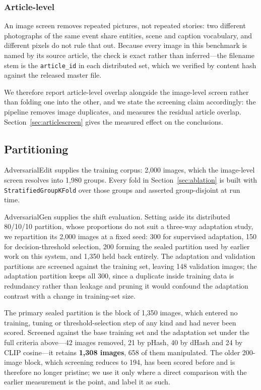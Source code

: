 \documentclass[journal]{IEEEtran}
\begin{document}
\subsubsection{Article-level}
\label{sec:articles}
An image screen removes repeated pictures, not repeated stories: two different
photographs of the same event share entities, scene and caption vocabulary, and
different pixels do not rule that out. Because every image in this benchmark is
named by its source article, the check is exact rather than inferred---the
filename stem is the \texttt{article\_id} in each distributed set, which we
verified by content hash against the released master file.

We therefore report article-level overlap alongside the image-level screen
rather than folding one into the other, and we state the screening claim
accordingly: the pipeline removes image duplicates, and measures the residual
article overlap. Section~\ref{sec:articlescreen} gives the measured effect on
the conclusions.

\subsection{Partitioning}
\label{sec:partition}

AdversarialEdit supplies the training corpus: 2{,}000 images, which the
image-level screen resolves into 1{,}980 groups. Every fold in
Section~\ref{sec:ablation} is built with \texttt{StratifiedGroupKFold} over
those groups and asserted group-disjoint at run time.

AdversarialGen supplies the shift evaluation. Setting aside its distributed
80/10/10 partition, whose proportions do not suit a three-way adaptation study,
we repartition its 2{,}000 images at a fixed seed: 300 for supervised
adaptation, 150 for decision-threshold selection, 200 forming the sealed
partition used by earlier work on this system, and 1{,}350 held back entirely.
The adaptation and validation partitions are screened against the training set,
leaving 148 validation images; the adaptation partition keeps all 300, since a
duplicate inside training data is redundancy rather than leakage and pruning it
would confound the adaptation contrast with a change in training-set size.

The primary sealed partition is the block of 1{,}350 images, which entered no
training, tuning or threshold-selection step of any kind and had never been
scored. Screened against the base training set and the adaptation set under the
full criteria above---42 images removed, 21 by pHash, 40 by dHash and 24 by
CLIP cosine---it retains \textbf{1{,}308 images}, 658 of them manipulated. The
older 200-image block, which screening reduces to 194, has been scored before
and is therefore no longer pristine; we use it only where a direct comparison
with the earlier measurement is the point, and label it as such.
\end{document}
